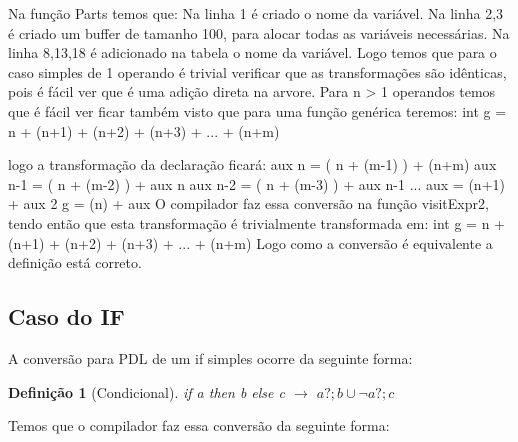 \documentclass{article}
\newtheorem{definition}{Definição}
\begin{document}
	Na função Parts temos que:
	\BlankLine
	Na linha 1 é criado o nome da variável. 
	Na linha 2,3  é criado um buffer de tamanho 100, para alocar todas as variáveis necessárias.
	Na linha 8,13,18 é adicionado na tabela o nome da variável.
	\BlankLine
	Logo temos que para o caso simples de 1 operando é trivial verificar que as transformações são idênticas, pois é fácil ver que é uma adição direta na arvore. Para n > 1 operandos temos que é fácil ver ficar também visto que para uma função genérica teremos:
	\BlankLine
	int g = n + (n+1) + (n+2) + (n+3) + ... + (n+m)
	\BlankLine
	
logo a transformação da declaração ficará: 
	\BlankLine
	aux n   = ( n + (m-1) ) + (n+m)  
	aux n-1 = ( n + (m-2) ) + aux n 
	aux n-2 = ( n + (m-3) ) + aux n-1 
	... 
	aux = (n+1) + aux 2 
	\BlankLine
	g = (n) + aux 
	\BlankLine
	O compilador faz essa conversão na função visitExpr2, tendo então que esta transformação é trivialmente transformada em: 
	\BlankLine
	int g = n + (n+1) + (n+2) + (n+3) + ... + (n+m)
	\BlankLine
	Logo como a conversão é equivalente a definição está correto.
	\BlankLine


	\subsection{Caso do IF}
		A conversão para PDL de um if simples ocorre da seguinte forma:
			\begin{definition}[Condicional]
		if a then b else c $\rightarrow$ $a?;b\cup\neg a?;c$
			\end{definition}
	
	Temos que o compilador faz essa conversão da seguinte forma:
	
\end{document}
